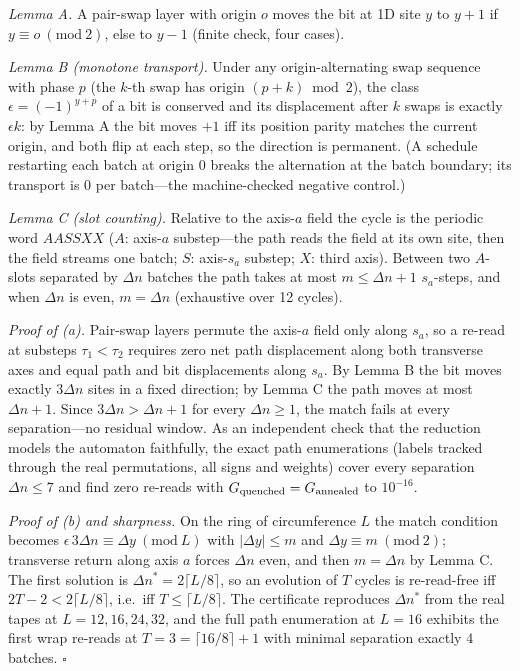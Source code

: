 \documentclass[aps,prd,twocolumn,superscriptaddress,nofootinbib,floatfix]{revtex4-2}
\begin{document}
\emph{Lemma A.} A pair-swap layer with origin $o$ moves the bit at 1D
site $y$ to $y+1$ if $y\equiv o\ (\mathrm{mod}\ 2)$, else to $y-1$
(finite check, four cases).

\emph{Lemma B (monotone transport).} Under any origin-alternating swap
sequence with phase $p$ (the $k$-th swap has origin $(p+k)\bmod2$), the
class $\epsilon=(-1)^{y+p}$ of a bit is conserved and its displacement
after $k$ swaps is exactly $\epsilon k$: by Lemma A the bit moves $+1$
iff its position parity matches the current origin, and both flip at
each step, so the direction is permanent. (A schedule restarting each
batch at origin $0$ breaks the alternation at the batch boundary; its
transport is $0$ per batch---the machine-checked negative control.)

\emph{Lemma C (slot counting).} Relative to the axis-$a$ field the
cycle is the periodic word $AASSXX$ ($A$: axis-$a$ substep---the path
reads the field at its own site, then the field streams one batch; $S$:
axis-$s_a$ substep; $X$: third axis). Between two $A$-slots separated
by $\Delta n$ batches the path takes at most $m\le\Delta n+1$
$s_a$-steps, and when $\Delta n$ is even, $m=\Delta n$ (exhaustive over
12 cycles).

\emph{Proof of (a).} Pair-swap layers permute the axis-$a$ field only
along $s_a$, so a re-read at substeps $\tau_1<\tau_2$ requires zero net
path displacement along both transverse axes and equal path and bit
displacements along $s_a$. By Lemma B the bit moves exactly $3\Delta n$
sites in a fixed direction; by Lemma C the path moves at most
$\Delta n+1$. Since $3\Delta n>\Delta n+1$ for every $\Delta n\ge1$,
the match fails at every separation---no residual window. As an
independent check that the reduction models the automaton faithfully,
the exact path enumerations (labels tracked through the real
permutations, all signs and weights) cover every separation
$\Delta n\le7$ and find zero re-reads with
$G_{\rm quenched}=G_{\rm annealed}$ to $10^{-16}$.

\emph{Proof of (b) and sharpness.} On the ring of circumference $L$ the
match condition becomes $\epsilon\,3\Delta n\equiv\Delta y\ (\mathrm{mod}\ L)$
with $|\Delta y|\le m$ and $\Delta y\equiv m\ (\mathrm{mod}\ 2)$;
transverse return along axis $a$ forces $\Delta n$ even, and then
$m=\Delta n$ by Lemma C. The first solution is
$\Delta n^*=2\lceil L/8\rceil$, so an evolution of $T$ cycles is
re-read-free iff $2T-2<2\lceil L/8\rceil$, i.e.\ iff
$T\le\lceil L/8\rceil$. The certificate reproduces $\Delta n^*$ from
the real tapes at $L=12,16,24,32$, and the full path enumeration at
$L=16$ exhibits the first wrap re-reads at $T=3=\lceil16/8\rceil+1$
with minimal separation exactly $4$ batches. \hfill$\square$
\end{document}
